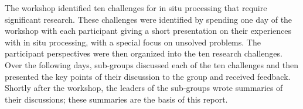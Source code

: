 

The workshop identified ten challenges for in situ processing that require significant research.
%
These challenges were identified by spending one day of the workshop with each participant giving a short
presentation on their experiences with in situ processing, with a special focus on unsolved problems.
%
The participant perspectives were then organized into the ten research challenges.
%
Over the following days, 
 sub-groups  discussed each of the ten challenges and then presented the key points of their discussion to the group and received feedback.
%
Shortly after the workshop, the leaders of the sub-groups wrote summaries of their discussions; these summaries are the basis of this
report.

